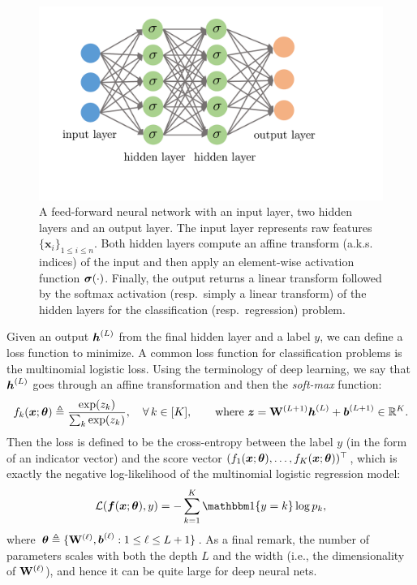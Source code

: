 \begin{figure}
\centering
\includegraphics[scale=0.4]{MLP}\caption{A feed-forward neural network with an input layer, two hidden layers and an output layer. The input layer represents raw features $\{\bm{x}_{i}\}_{1\leq i\leq n}$. Both hidden layers compute an affine transform (a.k.s. indices) of the input and then apply an element-wise activation function $\bm{\sigma}(\cdot)$. Finally, the output returns a linear transform followed by the softmax activation (resp.~simply a linear transform) of the hidden layers for the classification (resp.~regression) problem. \label{fig:FFNN}}
\end{figure}

Given an output $\text{\boldmath $h$}^{(L)}$ from the final hidden layer and a label $y$, we can define a loss function to minimize. A common loss function for classification problems is the multinomial logistic loss. Using the terminology of deep learning, we say that $\text{\boldmath $h$}^{(L)}$ goes through an affine transformation and then the \textit{soft-max} function:
\begin{equation*}
f_k(\text{\boldmath $x$}; \text{\boldmath $\theta$}) \triangleq  \frac{\exp(z_k)}{\sum_k \exp(z_k)}, \quad \forall\, k\in[K], \qquad \text{where}~ \text{\boldmath $z$} = \mathrm{\bf W}^{(L+1)} \text{\boldmath $h$}^{(L)} + \text{\boldmath $b$}^{(L+1)} \in \mathbb{R}^{K}.
\end{equation*}
Then the loss is defined to be the cross-entropy between the label $y$ (in the form of an indicator vector) and the score vector $ (f_1(\text{\boldmath $x$}; \text{\boldmath $\theta$}),\ldots,f_K(\text{\boldmath $x$}; \text{\boldmath $\theta$}))^\top$, which is exactly the negative log-likelihood of the multinomial logistic regression model:
\begin{equation}\label{eq:crossentropy}
\mathcal{L}(\ff(\xx; \btheta), y)=-\sum_{k=1}^K \bbone\{y = k\} \log p_k,
\end{equation}
where $\text{\boldmath $\theta$} \triangleq \{ \mathrm{\bf W}^{(\ell)}, \text{\boldmath $b$}^{(\ell)}: 1\leq \ell \leq L+1\}$.
As a final remark, the number of parameters scales with both the depth $L$ and the width (i.e., the dimensionality of $\mathrm{\bf W}^{(\ell)}$), and hence it can be quite large for deep neural nets. %

